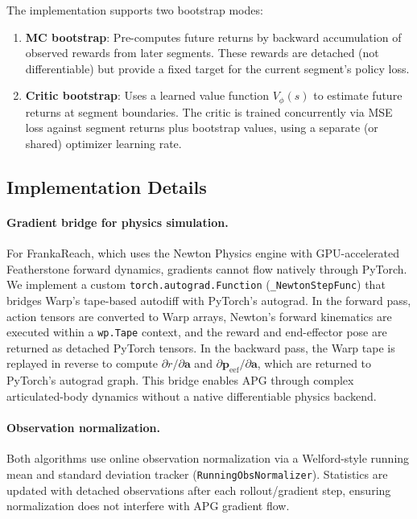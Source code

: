 \documentclass[11pt,a4paper]{article}
\newcommand{\bpf}{\mathbf{p}}
\newcommand{\ba}{\mathbf{a}}
\begin{document}
The implementation supports two bootstrap modes:

\begin{enumerate}
  \item \textbf{MC bootstrap}: Pre-computes future returns by backward accumulation of observed rewards from later segments. These rewards are detached (not differentiable) but provide a fixed target for the current segment's policy loss.

  \item \textbf{Critic bootstrap}: Uses a learned value function $V_\phi(s)$ to estimate future returns at segment boundaries. The critic is trained concurrently via MSE loss against segment returns plus bootstrap values, using a separate (or shared) optimizer learning rate.
\end{enumerate}

\subsection{Implementation Details}
\label{sec:implementation}

\paragraph{Gradient bridge for physics simulation.}
\label{sec:gradient_bridge}
For FrankaReach, which uses the Newton Physics engine with GPU-accelerated Featherstone forward dynamics, gradients cannot flow natively through PyTorch. We implement a custom \texttt{torch.autograd.Function} (\texttt{\_NewtonStepFunc}) that bridges Warp's tape-based autodiff with PyTorch's autograd. In the forward pass, action tensors are converted to Warp arrays, Newton's forward kinematics are executed within a \texttt{wp.Tape} context, and the reward and end-effector pose are returned as detached PyTorch tensors. In the backward pass, the Warp tape is replayed in reverse to compute $\partial r / \partial \ba$ and $\partial \bpf_{\text{eef}} / \partial \ba$, which are returned to PyTorch's autograd graph. This bridge enables APG through complex articulated-body dynamics without a native differentiable physics backend.

\paragraph{Observation normalization.}
Both algorithms use online observation normalization via a Welford-style running mean and standard deviation tracker (\texttt{RunningObsNormalizer}). Statistics are updated with detached observations after each rollout/gradient step, ensuring normalization does not interfere with APG gradient flow.
\end{document}
